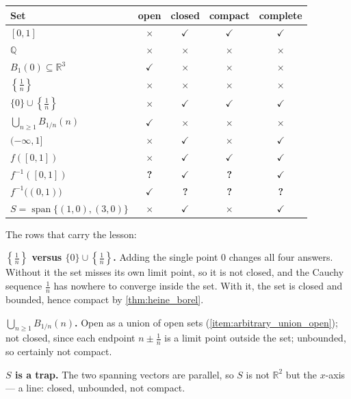 \begin{exercisesolution}
\begin{center}
\begin{tabular}{@{}l cccc@{}}
\textbf{Set} & \textbf{open} & \textbf{closed} & \textbf{compact} & \textbf{complete} \\
\hline
$[0,1]$ & $\times$ & $\checkmark$ & $\checkmark$ & $\checkmark$ \\
$\mathbb{Q}$ & $\times$ & $\times$ & $\times$ & $\times$ \\
$B_1(0) \subseteq \mathbb{R}^3$ & $\checkmark$ & $\times$ & $\times$ & $\times$ \\
$\left\{\tfrac1n\right\}$ & $\times$ & $\times$ & $\times$ & $\times$ \\
$\{0\}\cup\left\{\tfrac1n\right\}$ & $\times$ & $\checkmark$ & $\checkmark$ & $\checkmark$ \\
$\bigcup_{n\geq1}B_{1/n}(n)$ & $\checkmark$ & $\times$ & $\times$ & $\times$ \\
$(-\infty,1]$ & $\times$ & $\checkmark$ & $\times$ & $\checkmark$ \\
$f([0,1])$ & $\times$ & $\checkmark$ & $\checkmark$ & $\checkmark$ \\
$f^{-1}([0,1])$ & \textbf{?} & $\checkmark$ & \textbf{?} & $\checkmark$ \\
$f^{-1}\big((0,1)\big)$ & $\checkmark$ & \textbf{?} & \textbf{?} & \textbf{?} \\
$S = \operatorname{span}\{(1,0),(3,0)\}$ & $\times$ & $\checkmark$ & $\times$ & $\checkmark$ \\
\end{tabular}
\end{center}

The rows that carry the lesson:

\textbf{$\left\{\tfrac1n\right\}$ versus $\{0\}\cup\left\{\tfrac1n\right\}$.} Adding the single
point $0$ changes all four answers. Without it the set misses its own limit point, so it is not
closed, and the Cauchy sequence $\tfrac1n$ has nowhere to converge inside the set. With it, the
set is closed and bounded, hence compact by \cref{thm:heine_borel}.

\textbf{$\bigcup_{n\geq1}B_{1/n}(n)$.} Open as a union of open sets
(\cref{item:arbitrary_union_open}); not closed, since each endpoint $n\pm\tfrac1n$ is a limit
point outside the set; unbounded, so certainly not compact.

\textbf{$S$ is a trap.} The two spanning vectors are parallel, so $S$ is not $\mathbb{R}^2$ but
the $x$-axis --- a line: closed, unbounded, not compact.


\end{exercisesolution}
